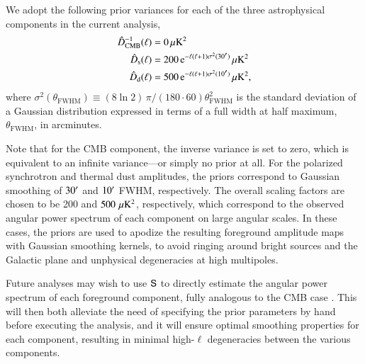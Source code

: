 \documentclass[twocolumn]{aa}
\renewcommand{\S}[0]{\tens{S}}
\newcommand{\?}[1]{\textcolor{red}{{\bf [#1]}}}
\begin{document}
We adopt the following prior variances for each of the three
astrophysical components in the current analysis,
\begin{align}
  \hat{D}^{-1}_{\mathrm{CMB}}(\ell) &= 0\,\mu\mathrm{K}^2\\
  \hat{D}_{\mathrm{s}}(\ell) &= 200\, \mathrm e^{-\ell(\ell+1)\sigma^2(30\arcm)}
  \,\mu\mathrm{K}^2\\
  \hat{D}_{\mathrm{d}}(\ell) &= 500\, \mathrm e^{-\ell(\ell+1)\sigma^2(10\arcm)}
  \,\mu\mathrm{K}^2,
\end{align}
where $\sigma^2(\theta_{\mathrm{FWHM}})\equiv (8\ln 2)\,
\pi/(180\cdot60)\theta_{\mathrm{FWHM}}^2$ is the standard deviation of a
Gaussian distribution expressed in terms of a full width at half maximum,
$\theta_{\mathrm{FWHM}}$, in arcminutes.

Note that for the CMB component, the inverse variance is set to zero,
which is equivalent to an infinite variance---or simply no prior at
all. For the polarized synchrotron and thermal dust amplitudes, the
priors correspond to Gaussian smoothing of $30\arcm$ and $10\arcm$
FWHM, respectively. The overall scaling factors are chosen to be 200
and $500\,\muK^2$, respectively, which correspond to the observed
angular power spectrum of each component on large angular scales. In
these cases, the priors are used to apodize the resulting foreground
amplitude maps with Gaussian smoothing kernels, to avoid ringing
around bright sources and the Galactic plane and unphysical
degeneracies at high multipoles.

Future analyses may wish to use $\S$ to directly estimate the
angular power spectrum of each foreground component, fully analogous to the CMB
case \citep{bp11,bp12}. This will then both alleviate the need of specifying the
prior parameters by hand before executing the analysis, and it will ensure
optimal smoothing properties for each component, resulting in minimal
high-$\ell$ degeneracies between the various components.
\end{document}
